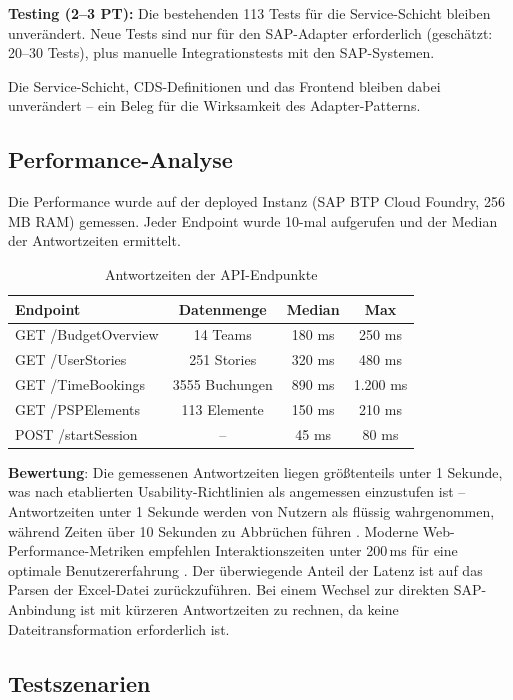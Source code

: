 \textbf{Testing (2--3 PT):} Die bestehenden 113 Tests für die Service-Schicht bleiben unverändert. Neue Tests sind nur für den SAP-Adapter erforderlich (geschätzt: 20--30 Tests), plus manuelle Integrationstests mit den SAP-Systemen.

Die Service-Schicht, CDS-Definitionen und das Frontend bleiben dabei unverändert -- ein Beleg für die Wirksamkeit des Adapter-Patterns.

\subsection{Performance-Analyse}

Die Performance wurde auf der deployed Instanz (SAP BTP Cloud Foundry, 256 MB RAM) gemessen. Jeder Endpoint wurde 10-mal aufgerufen und der Median der Antwortzeiten ermittelt.

\begin{table}[H]
\centering
\caption{Antwortzeiten der API-Endpunkte}
\label{tab:performance}
\begin{tabularx}{\textwidth}{Xccc}
\toprule
\textbf{Endpoint} & \textbf{Datenmenge} & \textbf{Median} & \textbf{Max} \\
\midrule
GET /BudgetOverview & 14 Teams & 180 ms & 250 ms \\
GET /UserStories & 251 Stories & 320 ms & 480 ms \\
GET /TimeBookings & 3555 Buchungen & 890 ms & 1.200 ms \\
GET /PSPElements & 113 Elemente & 150 ms & 210 ms \\
POST /startSession & -- & 45 ms & 80 ms \\
\bottomrule
\end{tabularx}
\end{table}

\textbf{Bewertung}: Die gemessenen Antwortzeiten liegen größtenteils unter 1 Sekunde, was nach etablierten Usability-Richtlinien als angemessen einzustufen ist -- Antwortzeiten unter 1 Sekunde werden von Nutzern als flüssig wahrgenommen, während Zeiten über 10 Sekunden zu Abbrüchen führen \citep{nielsen1993}. Moderne Web-Performance-Metriken empfehlen Interaktionszeiten unter 200\,ms für eine optimale Benutzererfahrung \citep{google2020}. Der überwiegende Anteil der Latenz ist auf das Parsen der Excel-Datei zurückzuführen. Bei einem Wechsel zur direkten SAP-Anbindung ist mit kürzeren Antwortzeiten zu rechnen, da keine Dateitransformation erforderlich ist.

\subsection{Testszenarien}

